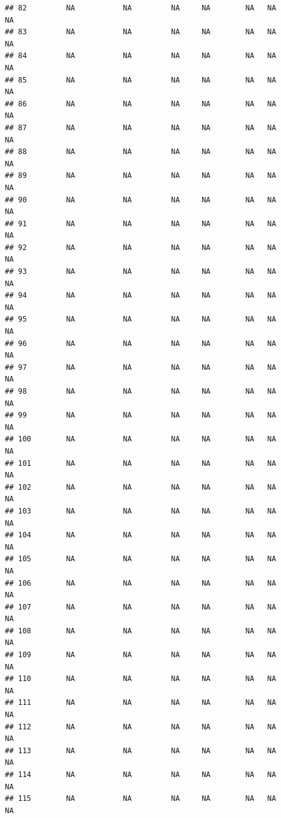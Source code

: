 \documentclass[
]{article}
\begin{document}
\begin{verbatim}
## 82         NA           NA         NA     NA        NA   NA             NA
## 83         NA           NA         NA     NA        NA   NA             NA
## 84         NA           NA         NA     NA        NA   NA             NA
## 85         NA           NA         NA     NA        NA   NA             NA
## 86         NA           NA         NA     NA        NA   NA             NA
## 87         NA           NA         NA     NA        NA   NA             NA
## 88         NA           NA         NA     NA        NA   NA             NA
## 89         NA           NA         NA     NA        NA   NA             NA
## 90         NA           NA         NA     NA        NA   NA             NA
## 91         NA           NA         NA     NA        NA   NA             NA
## 92         NA           NA         NA     NA        NA   NA             NA
## 93         NA           NA         NA     NA        NA   NA             NA
## 94         NA           NA         NA     NA        NA   NA             NA
## 95         NA           NA         NA     NA        NA   NA             NA
## 96         NA           NA         NA     NA        NA   NA             NA
## 97         NA           NA         NA     NA        NA   NA             NA
## 98         NA           NA         NA     NA        NA   NA             NA
## 99         NA           NA         NA     NA        NA   NA             NA
## 100        NA           NA         NA     NA        NA   NA             NA
## 101        NA           NA         NA     NA        NA   NA             NA
## 102        NA           NA         NA     NA        NA   NA             NA
## 103        NA           NA         NA     NA        NA   NA             NA
## 104        NA           NA         NA     NA        NA   NA             NA
## 105        NA           NA         NA     NA        NA   NA             NA
## 106        NA           NA         NA     NA        NA   NA             NA
## 107        NA           NA         NA     NA        NA   NA             NA
## 108        NA           NA         NA     NA        NA   NA             NA
## 109        NA           NA         NA     NA        NA   NA             NA
## 110        NA           NA         NA     NA        NA   NA             NA
## 111        NA           NA         NA     NA        NA   NA             NA
## 112        NA           NA         NA     NA        NA   NA             NA
## 113        NA           NA         NA     NA        NA   NA             NA
## 114        NA           NA         NA     NA        NA   NA             NA
## 115        NA           NA         NA     NA        NA   NA             NA

\end{verbatim}
\end{document}
